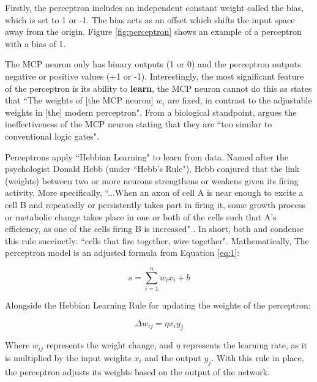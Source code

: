 \documentclass[report, 11pt, oneside]{dissertation}
\begin{document}
Firstly, the perceptron includes an independent constant weight called the bias, which  
is set to 1 or -1. The bias acts as an offset which shifts the input space away from the origin. Figure \ref{fig:perceptron} shows an example of a perceptron with a bias of 1.

The MCP neuron only has binary outputs (1 or 0) and the perceptron outputs negative or positive values (+1 or -1). Interestingly, the most significant feature of the perceptron is its ability to \textbf{learn}, the MCP neuron cannot do this as \autocite[9]{wang:2017} states that ``The weights of [the MCP neuron] $ w_i $ are fixed, in contrast to the adjustable weights in [the] modern perceptron". From a biological standpoint, \citep{Rojas:1996:NNS:235222} argues the ineffectiveness of the MCP neuron stating that they are ``too similar to conventional logic gates".

Perceptrons apply ``Hebbian Learning" to learn from data. Named after the psychologist Donald Hebb (under ``Hebb's Rule"), Hebb conjured that the link (weights) between two or more neurons strengthens or weakens given its firing activity. More specifically, ``...When an axon of cell A is near enough to excite a cell B and repeatedly or persistently takes part in firing it, some growth process or metabolic change takes place in one or both of the cells such that A's efficiency, as one of the cells firing B is increased" \citep[62]{hebb:1949}. In short, both \citep[211]{Lowel209} and \citep[21]{schatz1992developing} condense this rule succinctly: ``cells that fire together, wire together". Mathematically, The perceptron model is an adjusted formula from Equation \ref{eq:1}:
 
\begin{equation} \label{eq:3}
	s = \sum_{i = 1}^n w_i x_i + b
\end{equation}

Alongside the Hebbian Learning Rule for updating the weights of the perceptron:

\begin{equation} \label{eq:4}
	\Delta w_{ij} = \eta x_i y_j
\end{equation}

Where $ w_{ij} $ represents the weight change, and $ \eta $ represents the learning rate, as it is multiplied by the input weights $x_i$ and the output $y_j$. With this rule in place, the perceptron adjusts its weights based on the output of the network. 
\end{document}
